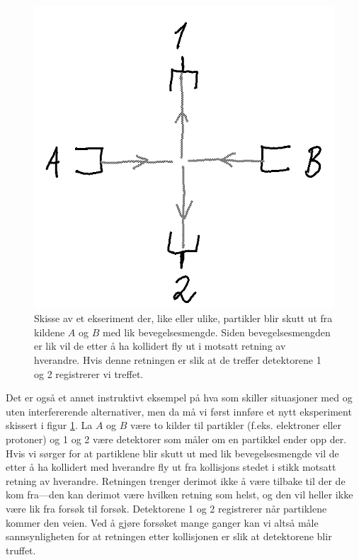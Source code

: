 \begin{figure}[tp]
\begin{center}
	\includegraphics{./spredningseksperiment}
\end{center}
\caption{Skisse av et ekseriment der, like eller ulike, partikler blir skutt ut fra kildene $A$ og $B$ med lik bevegelsesmengde. Siden bevegelsesmengden er lik vil de etter å ha kollidert fly ut i motsatt retning av hverandre. Hvis denne retningen er slik at de treffer detektorene 1 og 2 registrerer vi treffet.}
\label{fig:kvante:spredning}
\end{figure}

Det er også et annet instruktivt eksempel på hva som skiller situasjoner med og uten interfererende alternativer, men da må vi først innføre et nytt eksperiment skissert i figur \ref{fig:kvante:spredning}. La $A$ og $B$ være to kilder til partikler (f.eks. elektroner eller protoner) og 1 og 2 være detektorer som måler om en partikkel ender opp der. Hvis vi sørger for at partiklene blir skutt ut med lik bevegelsesmengde vil de etter å ha kollidert med hverandre fly ut fra kollisjons stedet i stikk motsatt retning av hverandre. Retningen trenger derimot ikke å være tilbake til der de kom fra---den kan derimot være hvilken retning som helst, og den vil heller ikke være lik fra forsøk til forsøk. Detektorene 1 og 2 registrerer når partiklene kommer den veien. Ved å gjøre forsøket mange ganger kan vi altså måle sannsynligheten for at retningen etter kollisjonen er slik at detektorene blir truffet.


